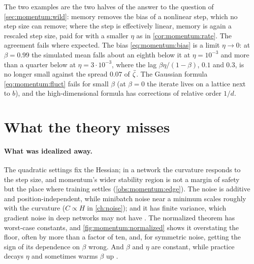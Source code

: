\begin{refsection}
The two examples are the two halves of the answer to the question of \cref{sec:momentum:wild}: memory removes the bias of a nonlinear step, which no step size can remove; where the step is effectively linear, memory is again a rescaled step size, paid for with a smaller $\eta$ as in \cref{cor:momentum:rate}. The agreement fails where expected. The bias \eqref{eq:momentum:bias} is a limit $\eta\to0$: at $\beta=0.99$ the simulated mean falls about an eighth below it at $\eta=10^{-3}$ and more than a quarter below at $\eta=3\cdot10^{-3}$, where the lag $\beta\eta/(1-\beta)$, $0.1$ and $0.3$, is no longer small against the spread $0.07$ of $\bar\zeta$. The Gaussian formula \eqref{eq:momentum:fluct} fails for small $\beta$ (at $\beta=0$ the iterate lives on a lattice next to $b$), and the high-dimensional formula has corrections of relative order $1/d$.

\section{What the theory misses}\label{sec:momentum:misses}

\paragraph{What was idealized away.} The quadratic settings fix the Hessian; in a network the curvature responds to the step size, and momentum's wider stability region is not a margin of safety but the place where training settles (\cref{obs:momentum:edge}). The noise is additive and position-independent, while minibatch noise near a minimum scales roughly with the curvature ($C\propto H$ in \cref{ch:noise}); and it has finite variance, which gradient noise in deep networks may not have \parencite{SimsekliSagunGurbuzbalaban2019}. The normalized theorem has worst-case constants, and \cref{fig:momentum:normalized} shows it overstating the floor, often by more than a factor of ten, and, for symmetric noise, getting the sign of its dependence on $\beta$ wrong. And $\beta$ and $\eta$ are constant, while practice decays $\eta$ and sometimes warms $\beta$ up \parencite{SutskeverEtAl2013}.


\end{refsection}
